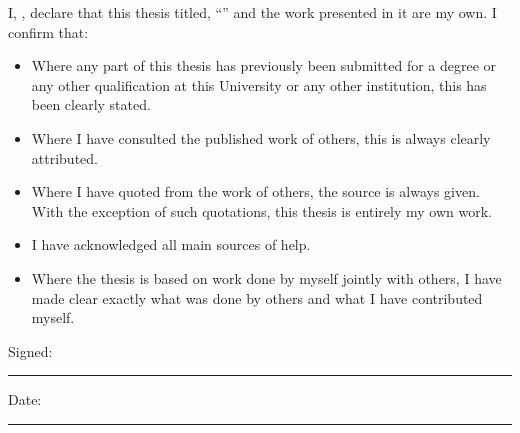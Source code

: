 
\begin{declaration}
	\addchaptertocentry{\authorshipname} %
	\noindent I, \authorname, declare that this thesis titled, \enquote{\ttitle} and the work presented in it are my own. I confirm that:
	
	\begin{itemize} 
		\item Where any part of this thesis has previously been submitted for a degree or any other qualification at this University or any other institution, this has been clearly stated.
		\item Where I have consulted the published work of others, this is always clearly attributed.
		\item Where I have quoted from the work of others, the source is always given. With the exception of such quotations, this thesis is entirely my own work.
		\item I have acknowledged all main sources of help.
		\item Where the thesis is based on work done by myself jointly with others, I have made clear exactly what was done by others and what I have contributed myself.\\
	\end{itemize}
	
	\noindent Signed:\\
	\rule[0.5em]{25em}{0.5pt} %
	
	\noindent Date:\\
	\rule[0.5em]{25em}{0.5pt} %
\end{declaration}

\cleardoublepage